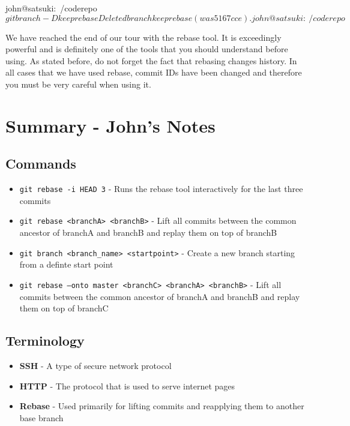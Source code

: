 \begin{code}
john@satsuki:~/coderepo$ git branch -D keeprebase
Deleted branch keeprebase (was 5167cce).
john@satsuki:~/coderepo$
\end{code}

We have reached the end of our tour with the rebase tool.
It is exceedingly powerful and is definitely one of the tools that you should understand before using.
As stated before, do not forget the fact that rebasing changes history.
In all cases that we have used rebase, commit IDs have been changed and therefore you must be very careful when using it.

\clearpage
\section{Summary - John's Notes}
\subsection{Commands}
\begin{itemize}
\item\texttt{git rebase -i HEAD~3} - Runs the rebase tool interactively for the last three commits
\item\texttt{git rebase <branchA> <branchB>} - Lift all commits between the common ancestor of branchA and branchB and replay them on top of branchB
\item\texttt{git branch <branch\_name> <startpoint>} - Create a new branch starting from a definte start point
\item\texttt{git rebase --onto master <branchC> \newline <branchA> <branchB>} - Lift all commits between the common ancestor of branchA and branchB and replay them on top of branchC
\end{itemize}

\subsection{Terminology}
\begin{itemize}
\item\textbf{SSH} - A type of secure network protocol
\item\textbf{HTTP} - The protocol that is used to serve internet pages
\item\textbf{Rebase} - Used primarily for lifting commits and reapplying them to another base branch
\end{itemize}
